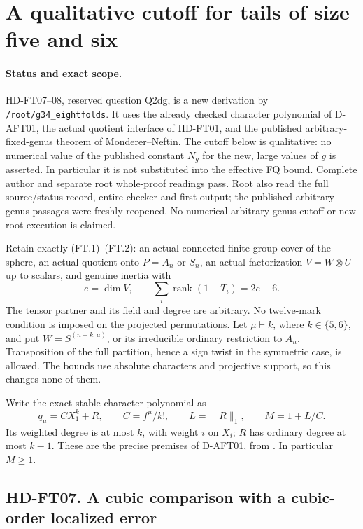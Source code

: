 \section{A qualitative cutoff for tails of size five and six}
\label{sec:factorwise-five-six-tail}

\paragraph{Status and exact scope.}
HD-FT07--08, reserved question Q2dg, is a new derivation by
\texttt{/root/g34\_eightfolds}.  It uses the already checked character
polynomial of D-AFT01, the actual quotient interface of HD-FT01, and
the published arbitrary-fixed-genus theorem of Monderer--Neftin.
The cutoff below is qualitative: no numerical value of the published
constant \(N_g\) for the new, large values of \(g\) is asserted.
In particular it is not substituted into the effective FQ bound.
Complete author and separate root whole-proof readings pass. Root also
read the full source/status record, entire checker and first output;
the published arbitrary-genus passages were freshly reopened.
No numerical arbitrary-genus cutoff or new root execution is claimed.

Retain exactly (FT.1)--(FT.2): an actual connected finite-group cover
of the sphere, an actual quotient onto \(P=A_n\) or \(S_n\), an actual
factorization \(V=W\otimes U\) up to scalars, and genuine inertia with
\[
 e=\dim V,\qquad
 \sum_i\operatorname{rank}(1-T_i)=2e+6.
 \tag{FT56.1}
\]
The tensor partner and its field and degree are arbitrary.  No twelve-mark
condition is imposed on the projected permutations.  Let
\(\mu\vdash k\), where \(k\in\{5,6\}\), and put
\(W=S^{(n-k,\mu)}\), or its irreducible ordinary restriction to \(A_n\).
Transposition of the full partition, hence a sign twist in the symmetric
case, is allowed.  The bounds use absolute characters and projective
support, so this changes none of them.

Write the exact stable character polynomial as
\[
 q_\mu=C X_1^k+R,\qquad C=f^\mu/k!,\qquad
 L=\|R\|_1,\qquad M=1+L/C.
 \tag{FT56.2}
\]
Its weighted degree is at most \(k\), with weight \(i\) on \(X_i\);
\(R\) has ordinary degree at most \(k-1\).  These are the precise
premises of D-AFT01, from
\cite[Proposition~I.1 and complete proof, pp.~9--11]{HD:GarsiaGoupil2009}.
In particular \(M\ge1\).

\subsection*{HD-FT07. A cubic comparison with a cubic-order localized error}

